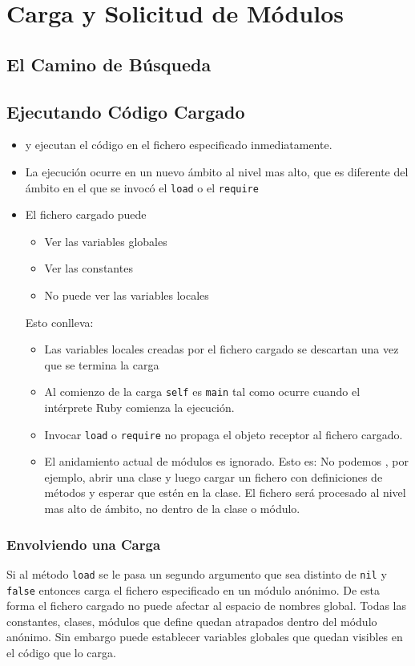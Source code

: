 \section{Carga y Solicitud de Módulos}

  \subsection{El Camino de Búsqueda}

  \subsection{Ejecutando Código Cargado}

\begin{itemize}
\item
{} y ejecutan el código en el fichero especificado inmediatamente.
\item
La ejecución ocurre en un nuevo ámbito al nivel mas alto, que es diferente
del ámbito en el que se invocó el \verb|load| o el \verb|require|
\item El fichero cargado puede 
\begin{itemize}
\item
Ver las variables globales
\item
Ver las constantes
\item
No puede ver  las variables locales
\end{itemize}
Esto conlleva:
\begin{itemize}
\item
Las variables locales creadas por el fichero cargado se descartan una vez que se termina la carga
\item
Al comienzo de la carga \verb|self| es \verb|main| tal como 
ocurre cuando el intérprete Ruby  comienza la ejecución. 
\item
Invocar \verb|load| o \verb|require| no propaga el objeto receptor 
al fichero cargado.
\item
El anidamiento actual de módulos es ignorado.
Esto es: No podemos , por ejemplo, abrir una clase y luego cargar un fichero con definiciones de métodos y esperar
que estén en la clase. El fichero será procesado al nivel mas alto de ámbito, no dentro de 
la clase o módulo.
\end{itemize}

\end{itemize}

     \subsubsection{Envolviendo una Carga}
     Si al método \verb|load| se le pasa un segundo argumento que sea distinto de \verb|nil| y \verb|false|
     entonces carga el fichero especificado en un módulo anónimo. De esta forma el fichero cargado
     no puede afectar al espacio de nombres global. Todas las constantes, clases, módulos que define 
     quedan atrapados dentro del módulo anónimo. Sin embargo puede establecer variables globales que quedan visibles
en el código que lo carga.

